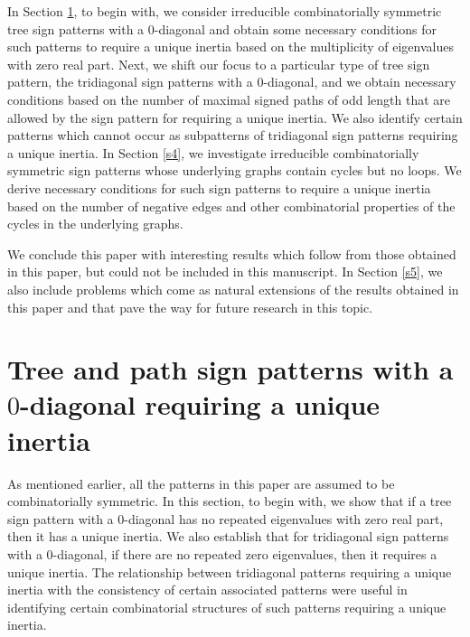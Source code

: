 \documentclass[a4paper, 10pt]{article}
\numberwithin{equation}{section}
\begin{document}
	
	
	
	
	In Section \ref{s2}, to begin with, we consider irreducible combinatorially symmetric tree sign patterns with a $0$-diagonal and obtain some necessary conditions for such patterns to require a unique inertia based on the multiplicity of eigenvalues with zero real part. Next, we shift our focus to a particular type of tree sign pattern, the tridiagonal sign patterns with a $0$-diagonal, and we obtain necessary conditions based on the number of maximal signed paths of odd length that are allowed by the sign pattern for requiring a unique inertia. We also identify certain patterns which cannot occur as subpatterns of tridiagonal sign patterns requiring a unique inertia. 
	In Section \ref{s4}, we investigate irreducible combinatorially symmetric sign patterns whose underlying graphs contain cycles but no loops. We derive necessary conditions for such sign patterns to require a unique inertia based on the number of negative edges and other combinatorial properties of the cycles in the underlying graphs.
	
	We conclude this paper with interesting results which follow from those obtained in this paper, but could not be included in this manuscript. In Section \ref{s5}, we also include problems which come as natural extensions of the results obtained in this paper and that pave the way for future research in this topic. 
	
	
	
	\section{Tree and path sign patterns with a $0$-diagonal requiring a unique inertia} \label{s2}
	
	As mentioned earlier, all the patterns in this paper are assumed to be combinatorially symmetric.
	In this section, to begin with, we show that if a tree sign pattern with a $0$-diagonal has no repeated eigenvalues with zero real part, then it has a unique inertia. 
	We also establish that for tridiagonal sign patterns with a $0$-diagonal, if there are no repeated zero eigenvalues, then it requires a unique inertia.
	The relationship between tridiagonal patterns requiring a unique inertia with the consistency of certain associated patterns were useful in identifying certain combinatorial structures of such patterns requiring a unique inertia.
	
	
	
	
	
\end{document}
